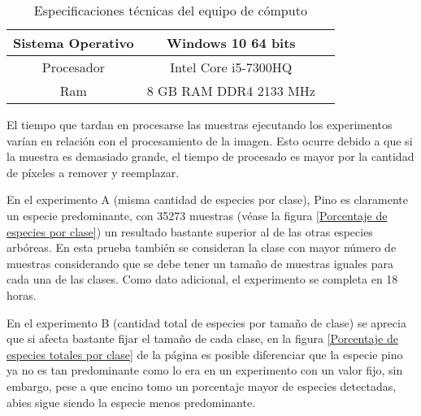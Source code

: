 \begin{table}[H]
	{\centering
		\caption{Especificaciones técnicas del equipo de cómputo}
		\begin{tabular}{|c|c|c|}
			\hline
			Sistema Operativo & Windows 10 64 bits\\
			\hline
			Procesador & Intel Core i5-7300HQ\\
			\hline
			Ram & 8 GB RAM DDR4 2133 MHz\\
			\hline
		\end{tabular}

	\label{tab:Especificaciones técnicas del PC}
	}
\end{table}


El tiempo que tardan en procesarse las muestras ejecutando los experimentos varían en relación con el procesamiento de la imagen. Esto ocurre debido a que si la muestra es demasiado grande, el tiempo de procesado es mayor por la cantidad de píxeles a remover y reemplazar. 


En el experimento A (misma cantidad de especies por clase), Pino es claramente un especie predominante, con 35273 muestras (véase la figura \ref{Porcentaje de especies por clase}) un resultado bastante superior al de las otras especies arbóreas. En esta prueba también se consideran la clase con mayor número de muestras  considerando que se debe tener un tamaño de muestras iguales para cada una de las clases. Como dato adicional, el experimento se completa en 18 horas.

En el experimento B (cantidad total de especies por tamaño de clase) se aprecia que si afecta bastante fijar el tamaño de cada clase, en la figura \ref{Porcentaje de especies totales por clase} de la página \pageref{Porcentaje de especies totales por clase} es posible diferenciar que la especie pino ya no es tan predominante como lo era en un experimento con un valor fijo, sin embargo, pese a que encino tomo un porcentaje mayor de especies detectadas, abies sigue siendo la especie menos predominante.

